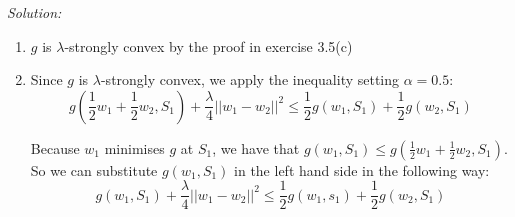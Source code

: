 \documentclass[
	10pt, %
	a4paper, %
	oneside, %
	headinclude,footinclude, %
	BCOR5mm, %
]{scrartcl}
\newenvironment{solution}
{\textit{Solution:}}
{}
\begin{document}
\begin{solution}
	\begin{enumerate}
		\item $g$ is $\lambda$-strongly convex by the proof in exercise 3.5(c)
		\item Since $g$ is $\lambda$-strongly convex, we apply the inequality setting $\alpha=0.5$: \[g(\frac{1}{2} w_1 + \frac{1}{2}w_2, S_1) + \frac{\lambda}{4}||w_1-w_2||^2 \leq \frac{1}{2} g(w_1, S_1) + \frac{1}{2}g(w_2, S_1)\]

		      Because $w_1$ minimises $g$ at $S_1$, we have that $g(w_1, S_1) \leq g(\frac{1}{2} w_1 + \frac{1}{2} w_2, S_1)$. So we can substitute $g(w_1, S_1)$ in the left hand side in the following way: \[g(w_1, S_1) + \frac{\lambda}{4}||w_1-w_2||^2 \leq \frac{1}{2}g(w_1, s_1) + \frac{1}{2}g(w_2, S_1)\]


\end{enumerate}
\end{solution}
\end{document}

